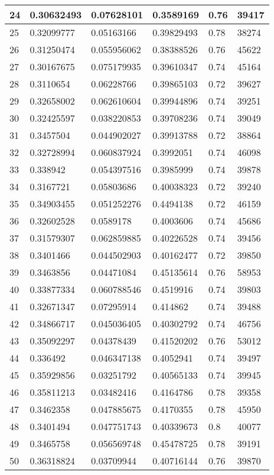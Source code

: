 \begin{longtable}{|l|l|l|l|l|l|}
24 & 0.30632493 & 0.07628101 & 0.3589169 & 0.76 & 39417 \\ \hline 
25 & 0.32099777 & 0.05163166 & 0.39829493 & 0.78 & 38274 \\ \hline 
26 & 0.31250474 & 0.055956062 & 0.38388526 & 0.76 & 45622 \\ \hline 
27 & 0.30167675 & 0.075179935 & 0.39610347 & 0.74 & 45164 \\ \hline 
28 & 0.3110654 & 0.06228766 & 0.39865103 & 0.72 & 39627 \\ \hline 
29 & 0.32658002 & 0.062610604 & 0.39944896 & 0.74 & 39251 \\ \hline 
30 & 0.32425597 & 0.038220853 & 0.39708236 & 0.74 & 39049 \\ \hline 
31 & 0.3457504 & 0.044902027 & 0.39913788 & 0.72 & 38864 \\ \hline 
32 & 0.32728994 & 0.060837924 & 0.3992051 & 0.74 & 46098 \\ \hline 
33 & 0.338942 & 0.054397516 & 0.3985999 & 0.74 & 39878 \\ \hline 
34 & 0.3167721 & 0.05803686 & 0.40038323 & 0.72 & 39240 \\ \hline 
35 & 0.34903455 & 0.051252276 & 0.4494138 & 0.72 & 46159 \\ \hline 
36 & 0.32602528 & 0.0589178 & 0.4003606 & 0.74 & 45686 \\ \hline 
37 & 0.31579307 & 0.062859885 & 0.40226528 & 0.74 & 39456 \\ \hline 
38 & 0.3401466 & 0.044502903 & 0.40162477 & 0.72 & 39850 \\ \hline 
39 & 0.3463856 & 0.04471084 & 0.45135614 & 0.76 & 58953 \\ \hline 
40 & 0.33877334 & 0.060788546 & 0.4519916 & 0.74 & 39803 \\ \hline 
41 & 0.32671347 & 0.07295914 & 0.414862 & 0.74 & 39488 \\ \hline 
42 & 0.34866717 & 0.045036405 & 0.40302792 & 0.74 & 46756 \\ \hline 
43 & 0.35092297 & 0.04378439 & 0.41520202 & 0.76 & 53012 \\ \hline 
44 & 0.336492 & 0.046347138 & 0.4052941 & 0.74 & 39497 \\ \hline 
45 & 0.35929856 & 0.03251792 & 0.40565133 & 0.74 & 39945 \\ \hline 
46 & 0.35811213 & 0.03482416 & 0.4164786 & 0.78 & 39358 \\ \hline 
47 & 0.3462358 & 0.047885675 & 0.4170355 & 0.78 & 45950 \\ \hline 
48 & 0.3401494 & 0.047751743 & 0.40339673 & 0.8 & 40077 \\ \hline 
49 & 0.3465758 & 0.056569748 & 0.45478725 & 0.78 & 39191 \\ \hline 
50 & 0.36318824 & 0.03709944 & 0.40716144 & 0.76 & 39870 \\ \hline 
\end{longtable}